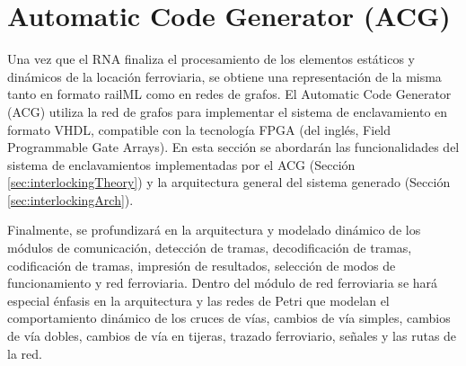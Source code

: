 \chapter{Automatic Code Generator (ACG)}
\label{sec:ACG}
    
    Una vez que el RNA finaliza el procesamiento de los elementos estáticos y dinámicos de la locación ferroviaria, se obtiene una representación de la misma tanto en formato railML como en redes de grafos. El Automatic Code Generator (ACG) utiliza la red de grafos para implementar el sistema de enclavamiento en formato VHDL, compatible con la tecnología FPGA (del inglés, Field Programmable Gate Arrays). En esta sección se abordarán las funcionalidades del sistema de enclavamientos implementadas por el ACG (Sección \ref{sec:interlockingTheory}) y la arquitectura general del sistema generado (Sección \ref{sec:interlockingArch}). 
    
    
    Finalmente, se profundizará en la arquitectura y modelado dinámico de los módulos de comunicación, detección de tramas, decodificación de tramas, codificación de tramas, impresión de resultados, selección de modos de funcionamiento y red ferroviaria. Dentro del módulo de red ferroviaria se hará especial énfasis en la arquitectura y las redes de Petri que modelan el comportamiento dinámico de los cruces de vías, cambios de vía simples, cambios de vía dobles, cambios de vía en tijeras, trazado ferroviario, señales y las rutas de la red.
    
    
     
        
    
